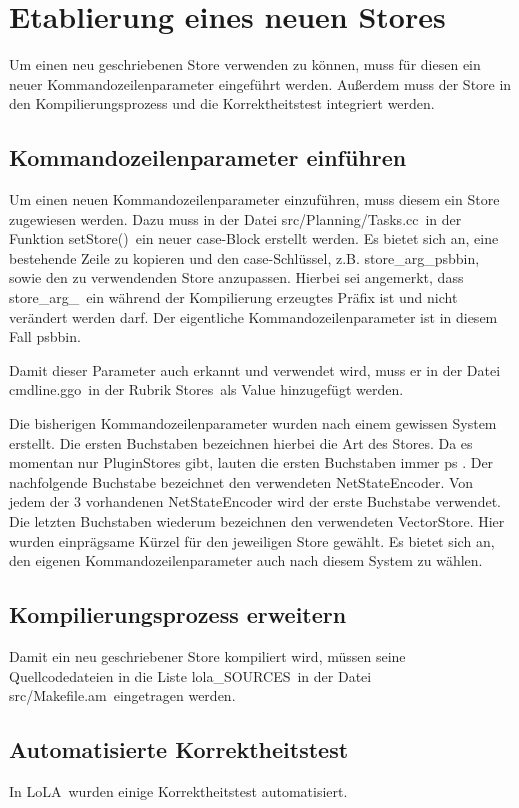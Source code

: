 \documentclass[12pt,a4paper,titlepage]{scrartcl}
\renewcommand \( {\left (}
\renewcommand \) {\right )}
\renewcommand \[ {\left [}
\renewcommand \] {\right ]}
\newcommand \Flqq {\flqq\ }
\newcommand{\lola}{\frqq LoLA\Flqq}
\begin{document}
\section{Etablierung eines neuen Stores}
Um einen neu geschriebenen Store verwenden zu können, muss für diesen ein neuer Kommandozeilenparameter eingeführt werden. Außerdem muss der Store in den Kompilierungsprozess und die Korrektheitstest integriert werden.

\subsection{Kommandozeilenparameter einführen}
Um einen neuen Kommandozeilenparameter einzuführen, muss diesem ein Store zugewiesen werden. Dazu muss in der Datei \frqq src/Planning/Tasks.cc\Flqq in der Funktion \frqq setStore()\Flqq ein neuer case-Block erstellt werden. Es bietet sich an, eine bestehende Zeile zu kopieren und den case-Schlüssel, z.B. \frqq store\_arg\_psbbin\flqq, sowie den zu verwendenden Store anzupassen. Hierbei sei angemerkt, dass \frqq store\_arg\_\Flqq ein während der Kompilierung erzeugtes Präfix ist und nicht verändert werden darf. Der eigentliche Kommandozeilenparameter ist in diesem Fall \frqq psbbin\flqq.

Damit dieser Parameter auch erkannt und verwendet wird, muss er in der Datei \frqq cmdline.ggo\Flqq in der Rubrik \frqq Stores\Flqq als Value hinzugefügt werden.

Die bisherigen Kommandozeilenparameter wurden nach einem gewissen System erstellt. Die ersten Buchstaben bezeichnen hierbei die Art des Stores. Da es momentan nur PluginStores gibt, lauten die ersten Buchstaben immer \frqq ps \flqq. Der nachfolgende Buchstabe bezeichnet den verwendeten NetStateEncoder. Von jedem der 3 vorhandenen NetStateEncoder wird der erste Buchstabe verwendet. Die letzten Buchstaben wiederum bezeichnen den verwendeten VectorStore. Hier wurden einprägsame Kürzel für den jeweiligen Store gewählt. Es bietet sich an, den eigenen Kommandozeilenparameter auch nach diesem System zu wählen.

\subsection{Kompilierungsprozess erweitern}
Damit ein neu geschriebener Store kompiliert wird, müssen seine Quellcodedateien in die Liste \frqq lola\_SOURCES\Flqq in der Datei \frqq src/Makefile.am\Flqq eingetragen werden.

\subsection{Automatisierte Korrektheitstest}
In \lola wurden einige Korrektheitstest automatisiert.
\end{document}
